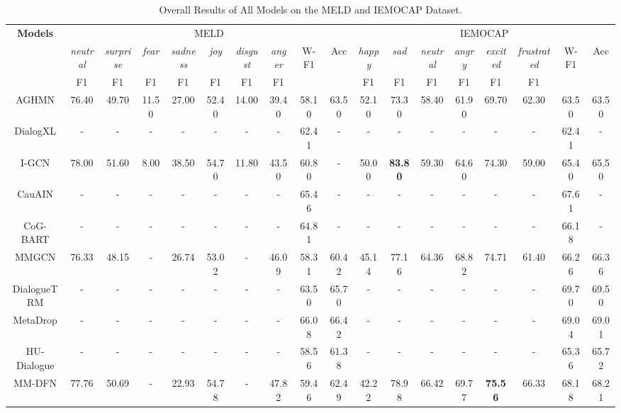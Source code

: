 \documentclass[journal]{IEEEtran}
\begin{document}
\begin{table*}[htbp]
    \centering
    \renewcommand{\arraystretch}{1.0}
    \footnotesize
\setlength{\tabcolsep}{3pt}
    \caption{Overall Results of All Models on the MELD and IEMOCAP Dataset.}
	\begin{threeparttable}
    \begin{tabular}{c|ccccccc|cc|cccccc|cc}
    \hline
    \multirow{3}{*}{\textbf{Models}} & \multicolumn{9}{c}{MELD} & \multicolumn{8}{c}{IEMOCAP}
	\\ \cline{2-18} 
     & \textit{neutral} & \textit{surprise} &\textit{fear} & \textit{sadness} & \textit{joy} &\textit{disgust} &\textit{anger}  & \multirow{2}{*}{W-F1} & \multirow{2}{*}{Acc} & \textit{happy} & \textit{sad} & \textit{neutral} & \textit{angry} &\textit{excited} &\textit{frustrated}  & \multirow{2}{*}{W-F1} & \multirow{2}{*}{Acc} \\ & F1 & F1  & F1 & F1 & F1 & F1 & F1 &  &  & F1 & F1  & F1 & F1 & F1 & F1 &  &  \\
    \hline
	AGHMN  & 76.40  & 49.70 & 11.50 & 27.00 & 52.40 & 14.00 & 39.40 & 58.10 &63.50 & 52.10  & 73.30 & 58.40 & 61.90 & 69.70 & 62.30 & 63.50 &63.50\\
    DialogXL   & - & - & - & - & - & - & - &62.41 &- & - & - & - & - & - & - &62.41 &- \\
    I-GCN   & 78.00 & 51.60 & 8.00 & 38.50 & 54.70 & 11.80 & 43.50 &60.80 &- & 50.00 & \textbf{83.80} & 59.30 & 64.60 & 74.30 & 59.00 &65.40 &65.50\\
    CauAIN   & - & - & - & - & - & - & - &65.46 &-  & - & - & - & - & - & - &67.61 &- \\
    CoG-BART  & -  & - & - & - & - & - & - &64.81 &- & -  & - & - & - & - & - &66.18 &- \\
	\hline
    MMGCN & 76.33 & 48.15 & - & 26.74 & 53.02 & - & 46.09 &58.31 &60.42 & 45.14 & 77.16 & 64.36 & 68.82 & 74.71 & 61.40 &66.26 &66.36 \\
    DialogueTRM  & - & - & - & - & - & - & - &63.50 &65.70 & - & - & - & - & - & - &69.70 &69.50\\
    MetaDrop   & - & - & - & - & - & - & -  &66.08 &66.42 & - & - & - & - & - & -  &69.04 &69.01 \\
	HU-Dialogue   & - & - & - & - & - & - & -  &58.56 &61.38 & - & - & - & - & - & -  &65.36 &65.72 \\
	MM-DFN   & 77.76 & 50.69 & - & 22.93 & 54.78 & - & 47.82  &59.46 &62.49 & 42.22 & 78.98 & 66.42 & 69.77 & \textbf{75.56} & 66.33  &68.18 &68.21 \\

\end{tabular}
\end{threeparttable}
\end{table*}
\end{document}
